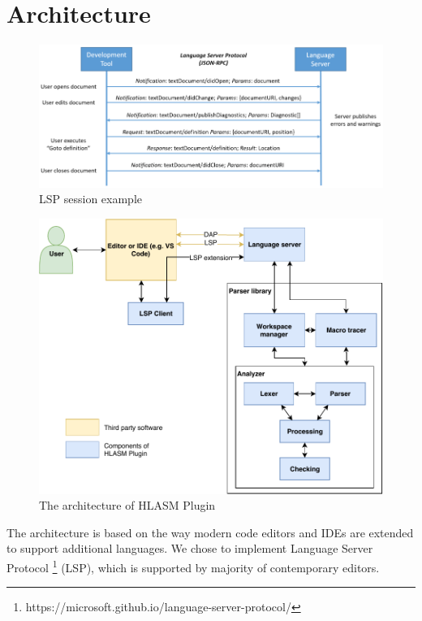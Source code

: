 \chapter{Architecture}

\begin{figure}
	\centering
	\includegraphics[width=\textwidth]{img/language-server-sequence}
	\caption{LSP session example}
	\label{fig04:LSP}
\end{figure}

\begin{figure}
	\centering
	\includegraphics[width=\textwidth]{img/hlasm_architecture}
	\caption{The architecture of HLASM Plugin}
	\label{fig04:arch}
\end{figure}



The architecture is based on the way modern code editors and IDEs are extended to support additional languages. We chose to implement Language Server Protocol \footnote{https://microsoft.github.io/language-server-protocol/} (LSP), which is supported by majority of contemporary editors.

